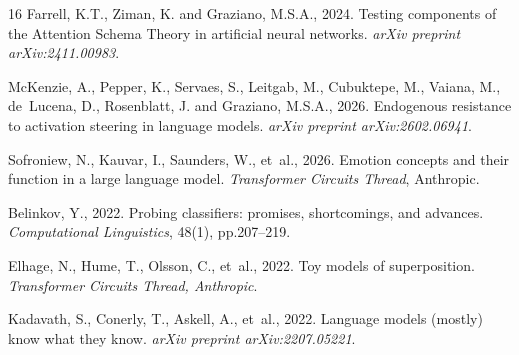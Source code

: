 \documentclass[11pt,a4paper]{article}
\begin{document}
\begin{thebibliography}{16}
Farrell, K.T., Ziman, K. and Graziano, M.S.A., 2024. Testing components of
the Attention Schema Theory in artificial neural networks. \textit{arXiv
preprint arXiv:2411.00983}.

McKenzie, A., Pepper, K., Servaes, S., Leitgab, M., Cubuktepe, M.,
Vaiana, M., de~Lucena, D., Rosenblatt, J. and Graziano, M.S.A., 2026.
Endogenous resistance to activation steering in language models.
\textit{arXiv preprint arXiv:2602.06941}.

Sofroniew, N., Kauvar, I., Saunders, W., et~al., 2026. Emotion concepts
and their function in a large language model. \textit{Transformer Circuits
Thread}, Anthropic.

Belinkov, Y., 2022. Probing classifiers: promises, shortcomings, and
advances. \textit{Computational Linguistics}, 48(1), pp.207--219.

Elhage, N., Hume, T., Olsson, C., et~al., 2022. Toy models of
superposition. \textit{Transformer Circuits Thread, Anthropic}.

Kadavath, S., Conerly, T., Askell, A., et~al., 2022. Language models
(mostly) know what they know. \textit{arXiv preprint arXiv:2207.05221}.

\end{thebibliography}
\end{document}
